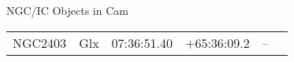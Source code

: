 \begin{block}{NGC/IC Objects in Cam}
  \centering
  \begin{tabularx}{\textwidth}{llrrll} 
    NGC2403 & Glx & 07:36:51.40 & +65:36:09.2  & -- \\ 
  \end{tabularx}
\end{block}